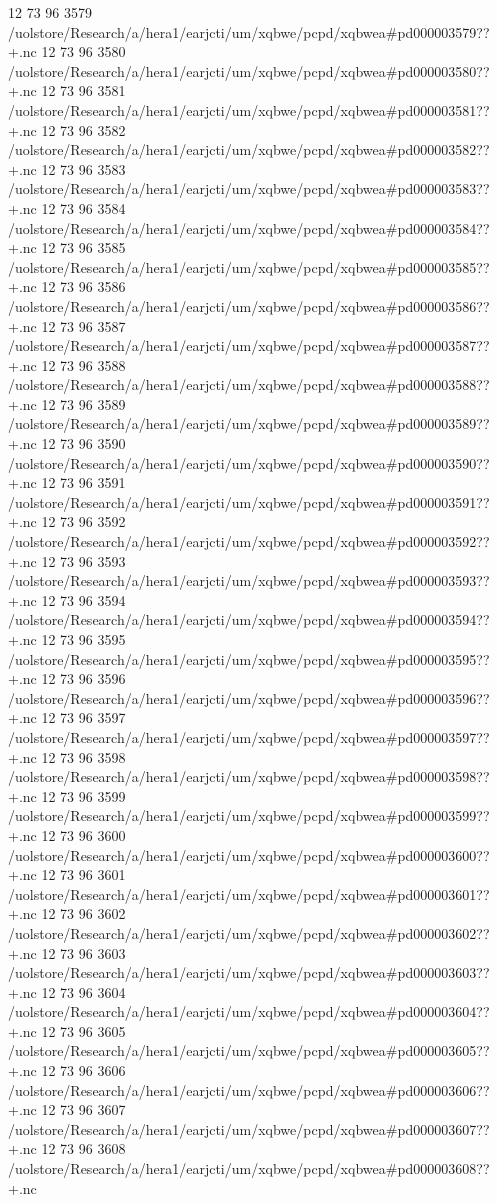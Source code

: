 12 73 96
3579
/uolstore/Research/a/hera1/earjcti/um/xqbwe/pcpd/xqbwea#pd000003579??+.nc
12 73 96
3580
/uolstore/Research/a/hera1/earjcti/um/xqbwe/pcpd/xqbwea#pd000003580??+.nc
12 73 96
3581
/uolstore/Research/a/hera1/earjcti/um/xqbwe/pcpd/xqbwea#pd000003581??+.nc
12 73 96
3582
/uolstore/Research/a/hera1/earjcti/um/xqbwe/pcpd/xqbwea#pd000003582??+.nc
12 73 96
3583
/uolstore/Research/a/hera1/earjcti/um/xqbwe/pcpd/xqbwea#pd000003583??+.nc
12 73 96
3584
/uolstore/Research/a/hera1/earjcti/um/xqbwe/pcpd/xqbwea#pd000003584??+.nc
12 73 96
3585
/uolstore/Research/a/hera1/earjcti/um/xqbwe/pcpd/xqbwea#pd000003585??+.nc
12 73 96
3586
/uolstore/Research/a/hera1/earjcti/um/xqbwe/pcpd/xqbwea#pd000003586??+.nc
12 73 96
3587
/uolstore/Research/a/hera1/earjcti/um/xqbwe/pcpd/xqbwea#pd000003587??+.nc
12 73 96
3588
/uolstore/Research/a/hera1/earjcti/um/xqbwe/pcpd/xqbwea#pd000003588??+.nc
12 73 96
3589
/uolstore/Research/a/hera1/earjcti/um/xqbwe/pcpd/xqbwea#pd000003589??+.nc
12 73 96
3590
/uolstore/Research/a/hera1/earjcti/um/xqbwe/pcpd/xqbwea#pd000003590??+.nc
12 73 96
3591
/uolstore/Research/a/hera1/earjcti/um/xqbwe/pcpd/xqbwea#pd000003591??+.nc
12 73 96
3592
/uolstore/Research/a/hera1/earjcti/um/xqbwe/pcpd/xqbwea#pd000003592??+.nc
12 73 96
3593
/uolstore/Research/a/hera1/earjcti/um/xqbwe/pcpd/xqbwea#pd000003593??+.nc
12 73 96
3594
/uolstore/Research/a/hera1/earjcti/um/xqbwe/pcpd/xqbwea#pd000003594??+.nc
12 73 96
3595
/uolstore/Research/a/hera1/earjcti/um/xqbwe/pcpd/xqbwea#pd000003595??+.nc
12 73 96
3596
/uolstore/Research/a/hera1/earjcti/um/xqbwe/pcpd/xqbwea#pd000003596??+.nc
12 73 96
3597
/uolstore/Research/a/hera1/earjcti/um/xqbwe/pcpd/xqbwea#pd000003597??+.nc
12 73 96
3598
/uolstore/Research/a/hera1/earjcti/um/xqbwe/pcpd/xqbwea#pd000003598??+.nc
12 73 96
3599
/uolstore/Research/a/hera1/earjcti/um/xqbwe/pcpd/xqbwea#pd000003599??+.nc
12 73 96
3600
/uolstore/Research/a/hera1/earjcti/um/xqbwe/pcpd/xqbwea#pd000003600??+.nc
12 73 96
3601
/uolstore/Research/a/hera1/earjcti/um/xqbwe/pcpd/xqbwea#pd000003601??+.nc
12 73 96
3602
/uolstore/Research/a/hera1/earjcti/um/xqbwe/pcpd/xqbwea#pd000003602??+.nc
12 73 96
3603
/uolstore/Research/a/hera1/earjcti/um/xqbwe/pcpd/xqbwea#pd000003603??+.nc
12 73 96
3604
/uolstore/Research/a/hera1/earjcti/um/xqbwe/pcpd/xqbwea#pd000003604??+.nc
12 73 96
3605
/uolstore/Research/a/hera1/earjcti/um/xqbwe/pcpd/xqbwea#pd000003605??+.nc
12 73 96
3606
/uolstore/Research/a/hera1/earjcti/um/xqbwe/pcpd/xqbwea#pd000003606??+.nc
12 73 96
3607
/uolstore/Research/a/hera1/earjcti/um/xqbwe/pcpd/xqbwea#pd000003607??+.nc
12 73 96
3608
/uolstore/Research/a/hera1/earjcti/um/xqbwe/pcpd/xqbwea#pd000003608??+.nc
